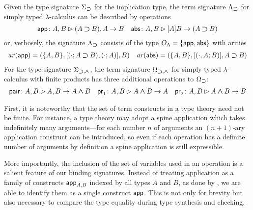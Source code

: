 \documentclass[acmsmall,screen]{acmart}
\theoremstyle{acmdefinition}
\begin{document}
\begin{example} \label{ex:STLC-sig}
  Given the type signature $\Sigma_{\mathbin{\bm{\supset}}}$ for the implication type, the term signature $\Lambda_{\mathbin{\bm{\supset}}}$ for simply typed $\lambda$-calculus can be described by operations
  \begin{align*}
    \mathsf{app}\colon A, B \rhd (A \mathbin{\bm{\supset}} B), A \to B && \mathsf{abs}\colon A , B \rhd [A]B \to (A \mathbin{\bm{\supset}} B)
  \end{align*}
    or, verbosely, the signature $\Lambda_{\mathbin{\bm{\supset}}}$ consists of the type $O_\Lambda = \{\mathsf{app}, \mathsf{abs}\}$ with arities
  \begin{align*}
    \mathit{ar}(\mathsf{app}) = (\{A, B\}, [(\cdot; A \mathbin{\bm{\supset}} B), (\cdot; A)], B)
    && 
    \mathit{ar}(\mathsf{abs}) = (\{A, B\}, [(\cdot, A; B)], A \mathbin{\bm{\supset}} B)
  \end{align*}
  For the type signature $\Sigma_{\mathbin{\bm{\supset}}, \mathbin{\bm{\wedge}}}$, the term signature $\Omega_{\mathbin{\bm{\supset}}, \mathbin{\bm{\wedge}}}$ for simply typed $\lambda$-calculus with finite products has three additional operations
to $\Omega_{\mathbin{\bm{\supset}}}$:
  \begin{align*}
    \mathsf{pair}\colon A, B \rhd A, B \to A \mathbin{\bm{\wedge}} B
    && \mathsf{pr}_{1} \colon A, B \rhd A \mathbin{\bm{\wedge}} B \to A
    && \mathsf{pr}_{2} \colon A, B \rhd A \mathbin{\bm{\wedge}} B \to B
  \end{align*}
\end{example}

First, it is noteworthy that the set of term constructs in a type theory need not be finite.
For instance, a type theory may adopt a spine application which takes indefinitely many arguments---for each number $n$ of arguments an $(n+1)$-ary application construct can be introduced, so even if each operation has a definite number of arguments by definition a spine application is still expressible.

More importantly, the inclusion of the set of variables used in an operation is a salient feature of our binding signatures.
Instead of treating application as a family of constructs $\mathsf{app}_{A, B}$ indexed by all types $A$ and $B$, as done by \citet{Fiore2022}, we are able to identify them as a single construct $\mathsf{app}$.
This is not only for brevity but also necessary to compare the type equality during type synthesis and checking.
\end{document}
